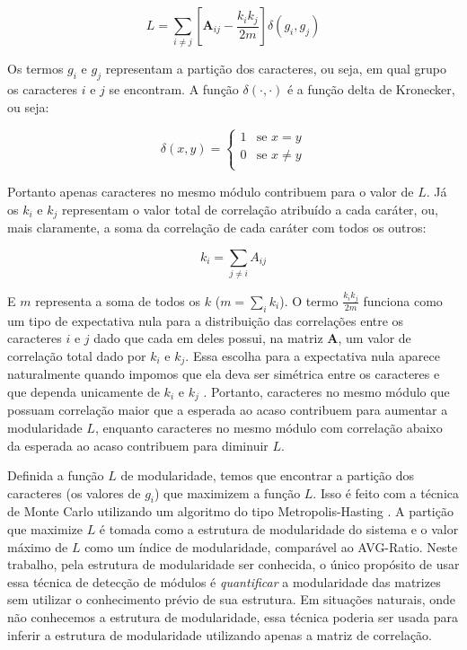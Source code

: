 \begin{equation}
    L = \sum_{i \neq j} \left[ \mathbf{A}_{ij} - \frac{k_ik_j}{2m} \right] \delta(g_i, g_j)
\end{equation}

Os termos $g_i$ e $g_j$ representam a partição dos caracteres, ou seja, em
qual grupo os caracteres $i$ e $j$ se encontram.
A função $\delta(\cdot,\cdot)$ é a função delta de Kronecker, ou seja:

\begin{equation}
   \delta (x,y) = \left \{ 
      \begin{array}{rl}
          1 & \text{se } x = y\\
          0 & \text{se } x \neq y\\
      \end{array} \right.
\end{equation}

Portanto apenas caracteres no mesmo módulo contribuem para o valor de $L$.
Já os $k_i$ e $k_j$  representam o valor total de correlação atribuído a
cada caráter, ou, mais claramente, a soma da correlação de cada caráter com
todos os outros:

\begin{equation}
   k_i = \sum_{j \neq i} A_{ij}
\end{equation}

E $m$ representa a soma de todos os $k$ ($m=\sum_i k_i$).
O termo $\frac{k_ik_j}{2m}$ funciona como um tipo de expectativa nula
para a distribuição das correlações entre os caracteres $i$ e $j$ dado que
cada em deles possui, na matriz $\mathbf{A}$, um valor de correlação total
dado por $k_i$ e $k_j$.
Essa escolha para a expectativa nula aparece naturalmente quando
impomos que ela deva ser simétrica entre os caracteres e que dependa
unicamente de $k_i$ e $k_j$ \citep[Para detalhes veja][]{Newman2006a}.
Portanto, caracteres no mesmo módulo que possuam correlação maior que a
esperada ao acaso contribuem para aumentar a modularidade $L$, enquanto
caracteres no mesmo módulo com correlação abaixo da esperada ao acaso
contribuem para diminuir $L$.

Definida a função $L$ de modularidade, temos que encontrar a partição
dos caracteres (os valores de $g_i$) que maximizem a função $L$.
Isso é feito com a técnica de Monte Carlo utilizando um algoritmo
do tipo Metropolis-Hasting \citep{Metropolis1953}.
A partição que maximize $L$ é tomada como a estrutura de modularidade do
sistema e o valor máximo de $L$ como um índice de modularidade,
comparável ao AVG-Ratio.
Neste trabalho, pela estrutura de modularidade ser conhecida, o único propósito 
de usar essa técnica de detecção de módulos é {\it quantificar} a 
modularidade das matrizes sem utilizar o conhecimento prévio de sua
estrutura.
Em situações naturais, onde não conhecemos a estrutura de modularidade,
essa técnica poderia ser usada para inferir a estrutura de modularidade
utilizando apenas a matriz de correlação.

